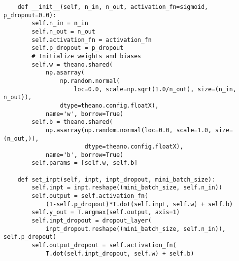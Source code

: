 \begin{lstlisting}
    def __init__(self, n_in, n_out, activation_fn=sigmoid, p_dropout=0.0):
        self.n_in = n_in
        self.n_out = n_out
        self.activation_fn = activation_fn
        self.p_dropout = p_dropout
        # Initialize weights and biases
        self.w = theano.shared(
            np.asarray(
                np.random.normal(
                    loc=0.0, scale=np.sqrt(1.0/n_out), size=(n_in, n_out)),
                dtype=theano.config.floatX),
            name='w', borrow=True)
        self.b = theano.shared(
            np.asarray(np.random.normal(loc=0.0, scale=1.0, size=(n_out,)),
                       dtype=theano.config.floatX),
            name='b', borrow=True)
        self.params = [self.w, self.b]

    def set_inpt(self, inpt, inpt_dropout, mini_batch_size):
        self.inpt = inpt.reshape((mini_batch_size, self.n_in))
        self.output = self.activation_fn(
            (1-self.p_dropout)*T.dot(self.inpt, self.w) + self.b)
        self.y_out = T.argmax(self.output, axis=1)
        self.inpt_dropout = dropout_layer(
            inpt_dropout.reshape((mini_batch_size, self.n_in)), self.p_dropout)
        self.output_dropout = self.activation_fn(
            T.dot(self.inpt_dropout, self.w) + self.b)


\end{lstlisting}
